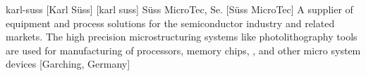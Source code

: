\newglsXcompany%
{karl-suss}%
[Karl S\"{u}ss]%
[karl suss]%
{S\"{u}ss MicroTec, Se.}%
[S\"{u}ss MicroTec]%
{A supplier of equipment and process solutions for the semiconductor industry and related markets. The high precision microstructuring systems like photolithography tools are used for manufacturing of processors, memory chips, ,  and other micro system devices \cite{website:Suss}}%
[Garching, Germany]%